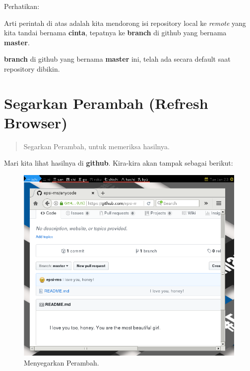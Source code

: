 \documentclass{article}
\begin{document}

\newpage

Perhatikan:


Arti perintah di atas adalah kita mendorong isi repository local
ke \textit{remote} yang kita tandai bernama \textbf{cinta},
tepatnya ke \textbf{branch} di github yang bernama \textbf{master}.

\textbf{branch} di github yang bernama \textbf{master} ini,
telah ada secara default saat repository dibikin.


\section{Segarkan Perambah (Refresh Browser)}

\begin{quote}
Segarkan Perambah, untuk memeriksa hasilnya.
\end{quote}

Mari kita lihat hasilnya di \textbf{github}.
Kira-kira akan tampak sebagai berikut:

\begin{figure}[H]
  \includegraphics[width=\linewidth]{github-refresh-browser.png}
  \caption{Menyegarkan Perambah.}
  \label{fig:git.refresh}
\end{figure}
\end{document}
